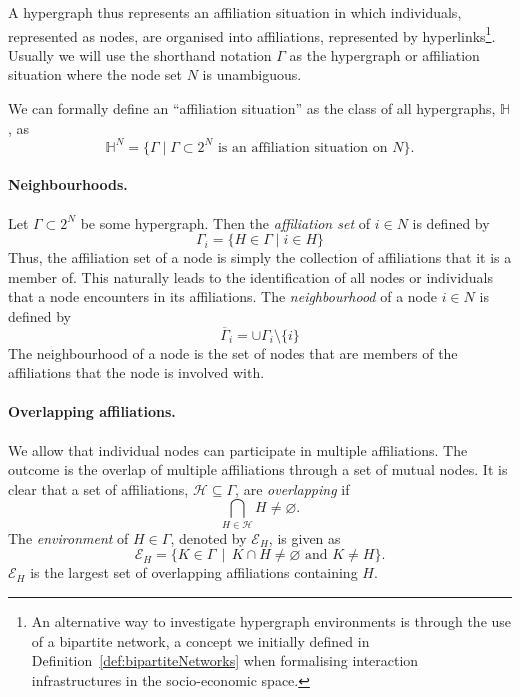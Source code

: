 A hypergraph thus represents an affiliation situation in which individuals, represented as nodes, are organised into affiliations, represented by hyperlinks\footnote{An alternative way to investigate hypergraph environments is through the use of a bipartite network, a concept we initially defined in Definition~\ref{def:bipartiteNetworks} when formalising interaction infrastructures in the socio-economic space.}. Usually we will use the shorthand notation $\Gamma$ as the hypergraph or affiliation situation where the node set $N$ is unambiguous.

We can formally define an ``affiliation situation'' as the class of all hypergraphs, $\mathbb{H}$, as
\begin{equation}
\mathbb{H}^N = \{ \Gamma \mid \Gamma \subset 2^N \mbox{ is an affiliation situation on } N \} .
\end{equation}

\paragraph{Neighbourhoods.}

Let $\Gamma \subset 2^N$ be some hypergraph. Then the \emph{affiliation set} of $i \in N$ is defined by
\begin{equation}
\Gamma_i = \{ H \in \Gamma \mid i \in H \}
\end{equation}
Thus, the affiliation set of a node is simply the collection of affiliations that it is a member of. This naturally leads to the identification of all nodes or individuals that a node encounters in its affiliations. The \emph{neighbourhood} of a node $i \in N$ is defined by
\begin{equation}
\overline{\Gamma}_i = \cup \Gamma_i \setminus \{ i \}
\end{equation}
The neighbourhood of a node is the set of nodes that are members of the affiliations that the node is involved with.

\paragraph{Overlapping affiliations.}

We allow that individual nodes can participate in multiple affiliations. The outcome is the overlap of multiple affiliations through a set of mutual nodes. It is clear that a set of affiliations, $\mathcal{H} \subseteq \Gamma$, are \emph{overlapping} if
\begin{equation}
\bigcap_{H \in \mathcal{H}} H \neq \varnothing .
\end{equation}
The \emph{environment} of $H \in \Gamma$, denoted by $\mathcal{E}_{H}$, is given as
\begin{equation}
\mathcal{E}_{H} = \{K \in \Gamma \, \mid \, K \cap H \neq \varnothing \mbox{ and } K \neq H \} .
\end{equation}
$\mathcal{E}_{H}$ is the largest set of overlapping affiliations containing $H$.

